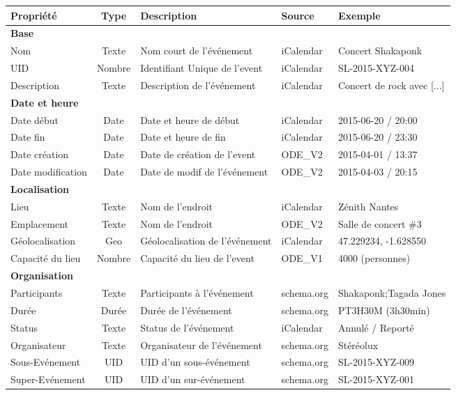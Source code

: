\begin{table}[h]
\begin{adjustwidth}{-1.8cm}{}
\begin{tabular}{|l || c | l | l | l |}

\hline
{\bf Propriété}&{\bf Type}&{\bf Description}&{\bf Source}&{\bf Exemple}\\
\hline
\hline

{\bf Base} &  &  &  &  \\

Nom & Texte & Nom court de l'événement & iCalendar & Concert Shakaponk \\
UID & Nombre & Identifiant Unique de l'event & iCalendar & SL-2015-XYZ-004 \\
Description & Texte & Description de l'événement & iCalendar & Concert de rock avec {[}...{]} \\

\hline

{\bf Date et heure} &  &  &  &  \\

Date début & Date & Date et heure de début & iCalendar & 2015-06-20 / 20:00 \\
Date fin & Date & Date et heure de fin & iCalendar & 2015-06-20 / 23:30 \\
Date création & Date & Date de création de l'event & ODE\_V2 & 2015-04-01 / 13:37 \\
Date modification & Date & Date de modif de l'événement & ODE\_V2 & 2015-04-03 / 20:15 \\

\hline

{\bf Localisation} &  &  &  &  \\

Lieu & Texte & Nom de l'endroit & iCalendar & Zénith Nantes \\
Emplacement & Texte & Nom de l'endroit & ODE\_V2 & Salle de concert \#3 \\
Géolocalisation & Geo & Géolocalisation de l'événement & iCalendar & 47.229234, -1.628550 \\
Capacité du lieu & Nombre & Capacité du lieu de l'event & ODE\_V1 & 4000 (personnes) \\

\hline

{\bf Organisation} &  &  &  &  \\

Participants & Texte & Participants à l'événement & schema.org & Shakaponk;Tagada Jones \\
Durée & Durée & Durée de l'événement & schema.org & PT3H30M (3h30min) \\
Status & Texte & Status de l'événement & iCalendar & Annulé / Reporté \\
Organisateur & Texte & Organisateur de l'événement & schema.org & Stéréolux \\
Sous-Evénement & UID & UID d'un sous-événement & schema.org & SL-2015-XYZ-009 \\
Super-Evénement & UID & UID d'un sur-événement & schema.org & SL-2015-XYZ-001 \\


\end{tabular}
\end{adjustwidth}
\end{table}
